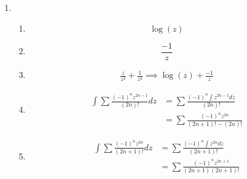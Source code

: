 \documentclass{article}
\begin{document}
\begin{enumerate}
\begin{enumerate}[label=(\roman*)]
      \end{enumerate}
    \item
      \begin{enumerate}[label=(\roman*)]
        \item
          \[\log(z)\]
        \item
          \[\frac{-1}{z}\]
        \item
          \begin{align*}
            \frac{z}{z^2}+\frac{1}{z^2}\implies\log(z)+\frac{-1}{z}
          \end{align*}
        \item
          \begin{align*}
            \int\sum\frac{ (-1)^nz^{2n-1}}{(2n)!}dz&=\sum\frac{ (-1)^n\int z^{2n-1}dz}{(2n)!}\\
            &=\sum\frac{ (-1)^nz^{2n}}{(2n+1)!-(2n)!}
          \end{align*}
        \item
          \begin{align*}
            \int\sum\frac{ (-1)^nz^{2n}}{(2n+1)!}dz&=\sum\frac{ (-1)^n\int z^{2n}dz}{(2n+1)!}\\
            &=\sum\frac{ (-1)^nz^{2n+1}}{(2n+1)(2n+1)!}
          \end{align*}
      \end{enumerate}
  \end{enumerate}
\end{document}
